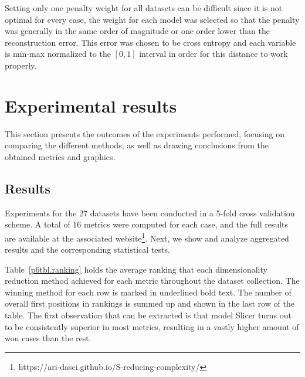   Setting only one penalty weight for all datasets can be difficult since it is not optimal for every case, the weight for each model was selected so that the penalty was generally in the same order of magnitude or one order lower than the reconstruction error. This error was chosen to be cross entropy and each variable is min-max normalized to the $[0,1]$ interval in order for this distance to work properly.

\fi

\section{Experimental results}\label{p6sec.experiments}

This section presents the outcomes of the experiments performed, focusing on comparing the different methods, as well as drawing conclusions from the obtained metrics and graphics.



\subsection{Results}

Experiments for the 27 datasets have been conducted in a 5-fold cross validation scheme. A total of 16 metrics were computed for each case, and the full results are available at the associated website\footnote{{https://ari-dasci.github.io/S-reducing-complexity/}}. Next, we show and analyze aggregated results and the corresponding statistical tests.

Table~\ref{p6tbl.ranking} holds the average ranking that each dimensionality reduction method achieved for each metric throughout the dataset collection. The winning method for each row is marked in underlined bold text. The number of overall first positions in rankings is summed up and shown in the last row of the table. The first observation that can be extracted is that model Slicer turns out to be consistently superior in most metrics, resulting in a vastly higher amount of won cases than the rest.

